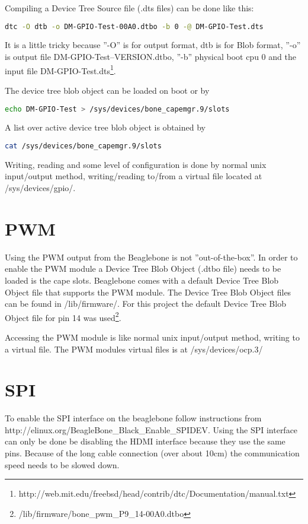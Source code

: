 \noindent
Compiling a Device Tree Source file (.dts files) can be done like this:
\begin{lstlisting}[language=bash]
dtc -O dtb -o DM-GPIO-Test-00A0.dtbo -b 0 -@ DM-GPIO-Test.dts
\end{lstlisting}
It is a little tricky because ''-O'' is for output format, dtb is for Blob format, ''-o'' is output file DM-GPIO-Test--VERSION.dtbo, ''-b'' physical boot cpu 0 and the input file DM-GPIO-Test.dts\footnote{http://web.mit.edu/freebsd/head/contrib/dtc/Documentation/manual.txt}.

\noindent
The device tree blob object can be loaded on boot or by
\begin{lstlisting}[language=bash]
echo DM-GPIO-Test > /sys/devices/bone_capemgr.9/slots
\end{lstlisting}

\noindent
A list over active device tree blob object is obtained by
\begin{lstlisting}[language=bash]
cat /sys/devices/bone_capemgr.9/slots
\end{lstlisting}

\noindent 
Writing, reading and some level of configuration is done by normal unix input/output method, writing/reading to/from a virtual file located at /sys/devices/gpio/.


\section{PWM}
Using the PWM output from the Beaglebone is not ''out-of-the-box''. In order to enable the PWM module a Device Tree Blob Object (.dtbo file) needs to be loaded is the cape slots. Beaglebone comes with a default Device Tree Blob Object file that supports the  PWM module. The Device Tree Blob Object files can be found in /lib/firmware/.
For this project the default Device Tree Blob Object file for pin 14 was used\footnote{/lib/firmware/bone\_pwm\_P9\_14-00A0.dtbo}. 

\noindent
Accessing the PWM module is like normal unix input/output method, writing to a virtual file. The PWM modules virtual files is at /sys/devices/ocp.3/

\section{SPI}
To enable the SPI interface on the beaglebone follow instructions from\\ http://elinux.org/BeagleBone\_Black\_Enable\_SPIDEV. Using the SPI interface can only be done be disabling the HDMI interface because they use the same pins. Because of the long cable connection (over about 10cm) the communication speed needs to be slowed down. 



